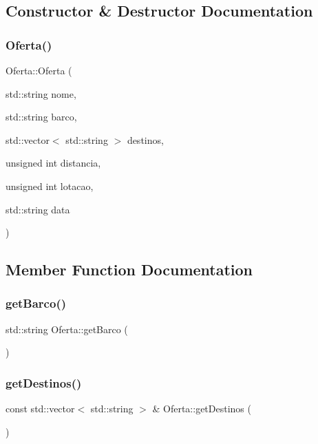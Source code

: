 \subsection{Constructor \& Destructor Documentation}
\mbox{\label{classOferta_a152ccaa1645e7999f89f896174c9cc03}} 
\subsubsection{\texorpdfstring{Oferta()}{Oferta()}}
{\footnotesize\ttfamily Oferta\+::\+Oferta (\begin{DoxyParamCaption}\item[{std\+::string}]{nome,  }\item[{std\+::string}]{barco,  }\item[{std\+::vector$<$ std\+::string $>$}]{destinos,  }\item[{unsigned int}]{distancia,  }\item[{unsigned int}]{lotacao,  }\item[{std\+::string}]{data }\end{DoxyParamCaption})}



\subsection{Member Function Documentation}
\mbox{\label{classOferta_aaed9b5937f9f33d2980fcc13ac02132c}} 
\subsubsection{\texorpdfstring{get\+Barco()}{getBarco()}}
{\footnotesize\ttfamily std\+::string Oferta\+::get\+Barco (\begin{DoxyParamCaption}{ }\end{DoxyParamCaption})\hspace{0.3cm}{\ttfamily [inline]}}

\mbox{\label{classOferta_a746c91e5db19098d211a3f6bde2ec8ec}} 
\subsubsection{\texorpdfstring{get\+Destinos()}{getDestinos()}}
{\footnotesize\ttfamily const std\+::vector$<$ std\+::string $>$ \& Oferta\+::get\+Destinos (\begin{DoxyParamCaption}{ }\end{DoxyParamCaption})}

